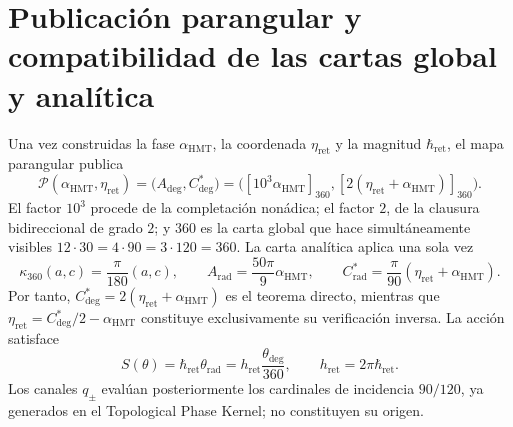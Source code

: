 \section{Publicación parangular y compatibilidad de las cartas global y analítica}
\label{sec:sucesor-102-c14-publicacion-parangular}

Una vez construidas la fase \(\alpha_{\mathrm{HMT}}\), la coordenada
\(\eta_{\mathrm{ret}}\) y la magnitud \(\hbar_{\mathrm{ret}}\), el mapa
parangular publica
\begin{equation}
 \mathcal P(\alpha_{\mathrm{HMT}},\eta_{\mathrm{ret}})
 =\bigl(A_{\deg},C^*_{\deg}\bigr)
 =\bigl([10^3\alpha_{\mathrm{HMT}}]_{360},
        [2(\eta_{\mathrm{ret}}+\alpha_{\mathrm{HMT}})]_{360}\bigr).
 \label{eq:sucesor-102-c14-mapa-parangular}
\end{equation}
El factor \(10^3\) procede de la completación nonádica; el factor \(2\),
de la clausura bidireccional de grado \(2\); y \(360\) es la carta global
que hace simultáneamente visibles
\(12\cdot30=4\cdot90=3\cdot120=360\).
La carta analítica aplica una sola vez
\begin{equation}
 \kappa_{360}(a,c)=\frac{\pi}{180}(a,c),
 \qquad
 A_{\mathrm{rad}}=\frac{50\pi}{9}\alpha_{\mathrm{HMT}},
 \qquad
 C^*_{\mathrm{rad}}
 =\frac{\pi}{90}(\eta_{\mathrm{ret}}+\alpha_{\mathrm{HMT}}).
 \label{eq:sucesor-102-c14-cartas}
\end{equation}
Por tanto,
\(C^*_{\deg}=2(\eta_{\mathrm{ret}}+\alpha_{\mathrm{HMT}})\) es el
teorema directo, mientras que
\(\eta_{\mathrm{ret}}=C^*_{\deg}/2-\alpha_{\mathrm{HMT}}\) constituye
exclusivamente su verificación inversa. La acción satisface
\begin{equation}
 S(\theta)=\hbar_{\mathrm{ret}}\theta_{\mathrm{rad}}
 =h_{\mathrm{ret}}\frac{\theta_{\deg}}{360},
 \qquad h_{\mathrm{ret}}=2\pi\hbar_{\mathrm{ret}}.
 \label{eq:sucesor-102-c14-accion-cartas}
\end{equation}
Los canales \(q_\pm\) evalúan posteriormente los cardinales de incidencia
\(90/120\), ya generados en el Topological Phase Kernel; no constituyen su
origen.
